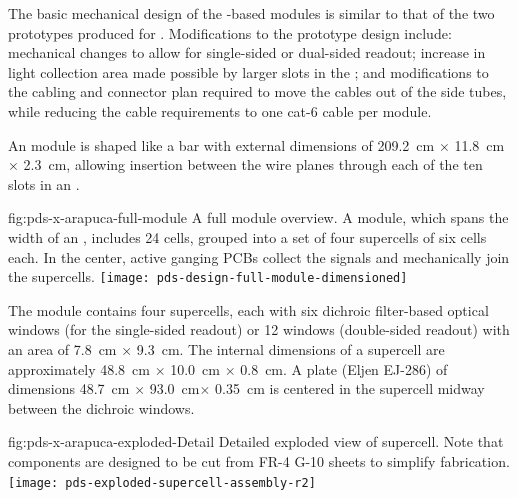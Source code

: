 The basic mechanical design of the -based  modules  
is similar to that of the two prototypes produced for . Modifications to the prototype design include:  mechanical changes to allow for single-sided or dual-sided readout; increase in light collection area made possible by larger slots in the ; and modifications to the cabling and connector plan required to move the  cables out of the  side tubes, while reducing the cable requirements to one cat-6 cable per  module.


An  module is shaped like a bar with external dimensions of \SI{209.2}{cm} $\times$ \SI{11.8}{cm} $\times$ \SI{2.3}{cm},  allowing insertion between the wire planes through each of the ten slots in an . 


\begin{dunefigure}
{fig:pds-x-arapuca-full-module}
{A full  module overview. A module, which spans the width of an , includes 24
  cells, grouped into a set of four supercells of six cells each. In the center, active ganging PCBs collect the signals and mechanically join the supercells.}
   \texttt{[image: pds-design-full-module-dimensioned]}
\end{dunefigure}

The module contains four  supercells, each with six dichroic filter-based optical windows (for the single-sided readout) or 12 windows (double-sided readout) with an area of \SI{7.8}{cm} $\times$ \SI{9.3}{cm}.  The internal dimensions of  a supercell are approximately \SI{48.8}{cm} $\times$ \SI{10.0}{cm} $\times$ \SI{0.8}{cm}. A  plate (Eljen EJ-286) of dimensions \SI{48.7}{cm} $\times$ \SI{93.0}{cm}$\times$ \SI{0.35}{cm} is centered in the supercell midway between the dichroic windows.  

\begin{dunefigure}{fig:pds-x-arapuca-exploded-Detail}
{Detailed exploded view of  supercell. Note that components are designed to be cut from FR-4 G-10 sheets to simplify fabrication.}
   \texttt{[image: pds-exploded-supercell-assembly-r2]}
\end{dunefigure}

